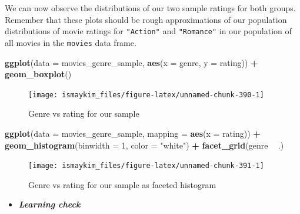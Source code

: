 \documentclass[12pt,]{krantz}
\makeatletter
\newenvironment{Shaded}{\begin{snugshade}}{\end{snugshade}}
\newcommand{\KeywordTok}[1]{\textcolor[rgb]{0.27,0.27,0.27}{\textbf{#1}}}
\newcommand{\DataTypeTok}[1]{\textcolor[rgb]{0.27,0.27,0.27}{#1}}
\newcommand{\DecValTok}[1]{\textcolor[rgb]{0.06,0.06,0.06}{#1}}
\newcommand{\StringTok}[1]{\textcolor[rgb]{0.5,0.5,0.5}{#1}}
\newcommand{\OperatorTok}[1]{\textcolor[rgb]{0.43,0.43,0.43}{\textbf{#1}}}
\newcommand{\NormalTok}[1]{#1}
\newenvironment{kframe}{%
\medskip{}
\setlength{\fboxsep}{.8em}
 \def\at@end@of@kframe{}%
 \ifinner\ifhmode%
  \def\at@end@of@kframe{\end{minipage}}%
  \begin{minipage}{\columnwidth}%
 \fi\fi%
 \def\FrameCommand##1{\hskip\@totalleftmargin \hskip-\fboxsep
 \colorbox{shadecolor}{##1}\hskip-\fboxsep
     \hskip-\linewidth \hskip-\@totalleftmargin \hskip\columnwidth}%
 \MakeFramed {\advance\hsize-\width
   \@totalleftmargin\z@ \linewidth\hsize
   \@setminipage}}%
 {\par\unskip\endMakeFramed%
 \at@end@of@kframe}
\renewenvironment{Shaded}{\begin{kframe}}{\end{kframe}}
\newenvironment{rmdblock}[1]
  {\begin{shaded*}
  \begin{itemize}
  \renewcommand{\labelitemi}{
    \raisebox{-.7\height}[0pt][0pt]{
    }
  }
  \item
  }
  {
  \end{itemize}
  \end{shaded*}
  }
\newenvironment{learncheck}
  {\begin{rmdblock}{warning}}
  {\end{rmdblock}}
\makeatother
\begin{document}
We can now observe the distributions of our two sample ratings for both
groups. Remember that these plots should be rough approximations of our
population distributions of movie ratings for \texttt{"Action"} and
\texttt{"Romance"} in our population of all movies in the
\texttt{movies} data frame.

\begin{Shaded}
\begin{Highlighting}[]
\KeywordTok{ggplot}\NormalTok{(}\DataTypeTok{data =}\NormalTok{ movies_genre_sample, }\KeywordTok{aes}\NormalTok{(}\DataTypeTok{x =}\NormalTok{ genre, }\DataTypeTok{y =}\NormalTok{ rating)) }\OperatorTok{+}
\StringTok{  }\KeywordTok{geom_boxplot}\NormalTok{()}
\end{Highlighting}
\end{Shaded}

\begin{figure}

{\centering \texttt{[image: ismaykim\_files/figure-latex/unnamed-chunk-390-1]} 

}

\caption{Genre vs rating for our sample}\label{fig:unnamed-chunk-390}
\end{figure}

\begin{Shaded}
\begin{Highlighting}[]
\KeywordTok{ggplot}\NormalTok{(}\DataTypeTok{data =}\NormalTok{ movies_genre_sample, }\DataTypeTok{mapping =} \KeywordTok{aes}\NormalTok{(}\DataTypeTok{x =}\NormalTok{ rating)) }\OperatorTok{+}
\StringTok{  }\KeywordTok{geom_histogram}\NormalTok{(}\DataTypeTok{binwidth =} \DecValTok{1}\NormalTok{, }\DataTypeTok{color =} \StringTok{"white"}\NormalTok{) }\OperatorTok{+}
\StringTok{  }\KeywordTok{facet_grid}\NormalTok{(genre }\OperatorTok{~}\StringTok{ }\NormalTok{.)}
\end{Highlighting}
\end{Shaded}

\begin{figure}

{\centering \texttt{[image: ismaykim\_files/figure-latex/unnamed-chunk-391-1]} 

}

\caption{Genre vs rating for our sample as faceted histogram}\label{fig:unnamed-chunk-391}
\end{figure}

\begin{learncheck}
\textbf{\emph{Learning check}}
\end{learncheck}
\end{document}
